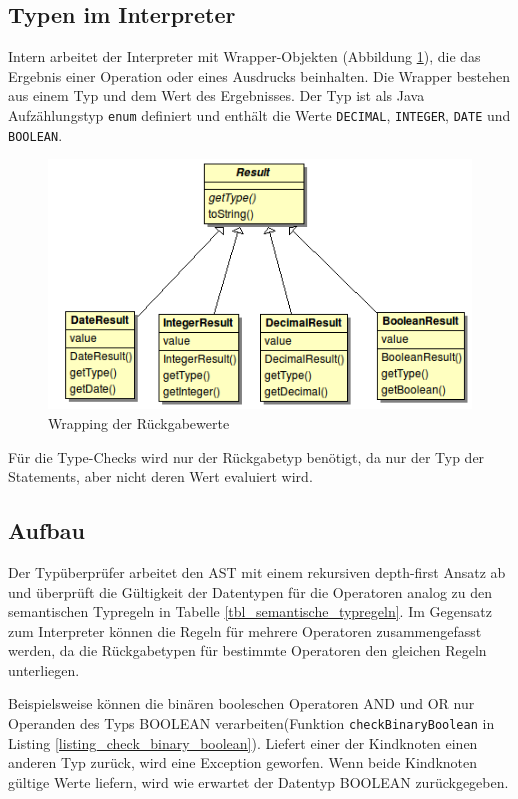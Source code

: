 \subsection{Typen im Interpreter}

Intern arbeitet der Interpreter mit Wrapper-Objekten (Abbildung \ref{figure_result_wrapper}), die das Ergebnis einer Operation oder eines Ausdrucks beinhalten. Die Wrapper bestehen aus einem Typ und dem Wert des Ergebnisses. Der Typ ist als Java Aufzählungstyp \texttt{enum} definiert und enthält die Werte \texttt{DECIMAL}, \texttt{INTEGER}, \texttt{DATE} und \texttt{BOOLEAN}.

\begin{figure}[h]
\includegraphics[scale=0.7]{figures/uml_result_classes}
\caption{Wrapping der Rückgabewerte}
\label{figure_result_wrapper}
\end{figure}

Für die Type-Checks wird nur der Rückgabetyp benötigt, da nur der Typ der Statements, aber nicht deren Wert evaluiert wird.


\subsection{Aufbau}

Der Typüberprüfer arbeitet den AST mit einem rekursiven depth-first Ansatz ab und überprüft die Gültigkeit der Datentypen für die Operatoren analog zu den semantischen Typregeln in Tabelle \ref{tbl_semantische_typregeln}. Im Gegensatz zum Interpreter können die Regeln für mehrere Operatoren zusammengefasst werden, da die Rückgabetypen für bestimmte Operatoren den gleichen Regeln unterliegen. 

Beispielsweise können die binären booleschen Operatoren AND und OR nur Operanden des Typs BOOLEAN verarbeiten(Funktion \texttt{checkBinaryBoolean} in Listing \ref{listing_check_binary_boolean}). Liefert einer der Kindknoten einen anderen Typ zurück, wird eine Exception geworfen. Wenn beide Kindknoten gültige Werte liefern, wird wie erwartet der Datentyp BOOLEAN zurückgegeben.

